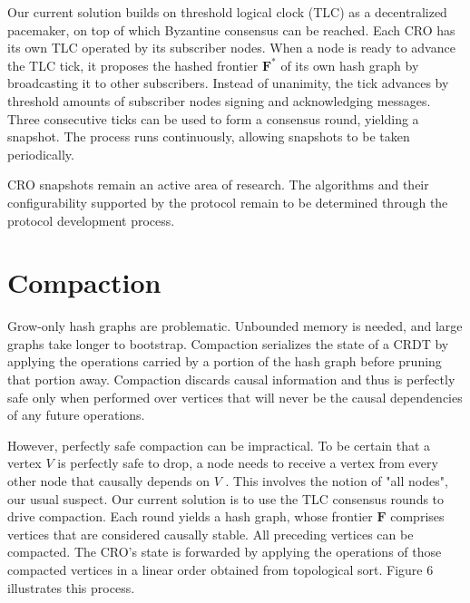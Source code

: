 \documentclass{article}
\begin{document}
Our current solution builds on threshold logical clock (TLC) \cite{TLC} as a decentralized pacemaker, on top of which Byzantine consensus can be reached. Each CRO has its own TLC operated by its subscriber nodes. When a node is ready to advance the TLC tick, it proposes the hashed frontier $\textbf{F}^*$ of its own hash graph by broadcasting it to other subscribers. Instead of unanimity, the tick advances by threshold amounts of subscriber nodes signing and acknowledging messages. Three consecutive ticks can be used to form a consensus round, yielding a snapshot. The process runs continuously, allowing snapshots to be taken periodically.

CRO snapshots remain an active area of research. The algorithms and their configurability supported by the protocol remain to be determined through the protocol development process.

\section{Compaction}
\label{sec:headings}

Grow-only hash graphs are problematic. Unbounded memory is needed, and large graphs take longer to bootstrap. Compaction serializes the state of a CRDT by applying the operations carried by a portion of the hash graph before pruning that portion away. Compaction discards causal information and thus is perfectly safe only when performed over vertices that will never be the causal dependencies of any future operations.

However, perfectly safe compaction can be impractical. To be certain that a vertex $V$ is perfectly safe to drop, a node needs to receive a vertex from every other node that causally depends on $V$ \cite{PO-CRDT}. This involves the notion of "all nodes", our usual suspect. Our current solution is to use the TLC consensus rounds to drive compaction. Each round yields a hash graph, whose frontier $\textbf{F}$ comprises vertices that are considered causally stable. All preceding vertices can be compacted. The CRO's state is forwarded by applying the operations of those compacted vertices in a linear order obtained from topological sort. Figure 6 illustrates this process.
\end{document}
